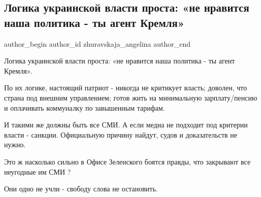  
 
 
 
 
 
\subsection{Логика украинской власти проста: «не нравится наша политика - ты агент Кремля»}
\label{sec:21_08_2021.fb.zhuravskaja_angelina.1.vlast_agenty_kremlja}
 
\ifcmt
 author_begin
   author_id zhuravskaja_angelina
 author_end
\fi

Логика украинской власти проста: «не нравится наша политика - ты агент Кремля».

По их логике, настоящий патриот - никогда не критикует власть; доволен, что
страна под внешним управлением; готов жить на минимальную зарплату/пенсию и
оплачивать коммуналку по завышенным тарифам. 

И такими же должны быть все СМИ. А если медиа не подходит под критерии власти -
санкции. Официальную причину найдут, судов и доказательств не нужно.

Это ж насколько сильно в Офисе Зеленского боятся правды, что закрывают все
неугодные им СМИ ?

Они одно не учли - свободу слова не остановить.
